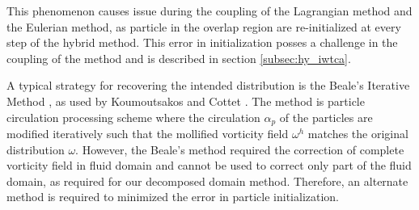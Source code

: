 This phenomenon causes issue during the coupling of the Lagrangian method and the Eulerian method, as particle in the overlap region are re-initialized at every step of the hybrid method. This error in initialization posses a challenge in the coupling of the method and is described in section \ref{subsec:hy_iwtca}.

A typical strategy for recovering the intended distribution is the Beale's Iterative Method \cite{Beale1988}, as used by Koumoutsakos and Cottet \cite{Cottet2000a}. The method is particle circulation processing scheme where the circulation $\alpha_p$ of the particles are modified iteratively such that the mollified vorticity field $\omega^h$ matches the original distribution $\omega$. However, the Beale's method required the correction of complete vorticity field in fluid domain and cannot be used to correct only part of the fluid domain, as required for our decomposed domain method. Therefore, an alternate method is required to minimized the error in particle initialization.

